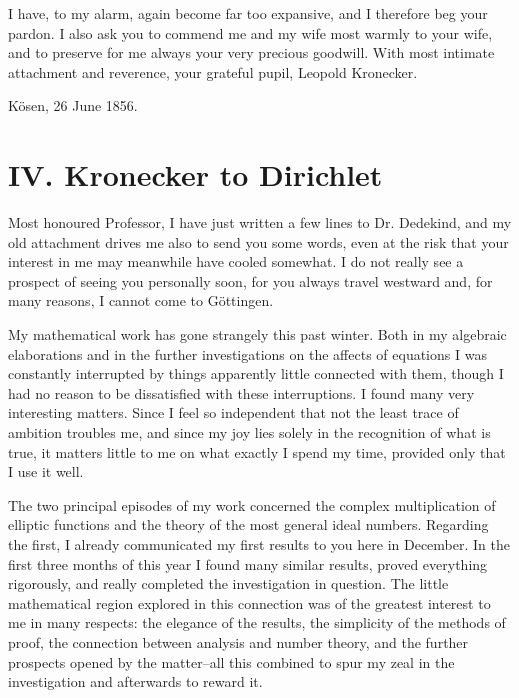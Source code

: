 \documentclass[11pt]{article}
\begin{document}
I have, to my alarm, again become far too expansive, and I therefore beg your pardon. I also ask you to commend me and my wife most warmly to your wife, and to preserve for me always your very precious goodwill. With most intimate attachment and reverence, your grateful pupil, Leopold Kronecker.

Kösen, 26 June 1856.

\section*{IV. Kronecker to Dirichlet}
Most honoured Professor, I have just written a few lines to Dr. Dedekind, and my old attachment drives me also to send you some words, even at the risk that your interest in me may meanwhile have cooled somewhat. I do not really see a prospect of seeing you personally soon, for you always travel westward and, for many reasons, I cannot come to Göttingen.

My mathematical work has gone strangely this past winter. Both in my algebraic elaborations and in the further investigations on the affects of equations I was constantly interrupted by things apparently little connected with them, though I had no reason to be dissatisfied with these interruptions. I found many very interesting matters. Since I feel so independent that not the least trace of ambition troubles me, and since my joy lies solely in the recognition of what is true, it matters little to me on what exactly I spend my time, provided only that I use it well.

The two principal episodes of my work concerned the complex multiplication of elliptic functions and the theory of the most general ideal numbers. Regarding the first, I already communicated my first results to you here in December. In the first three months of this year I found many similar results, proved everything rigorously, and really completed the investigation in question. The little mathematical region explored in this connection was of the greatest interest to me in many respects: the elegance of the results, the simplicity of the methods of proof, the connection between analysis and number theory, and the further prospects opened by the matter--all this combined to spur my zeal in the investigation and afterwards to reward it.
\end{document}
